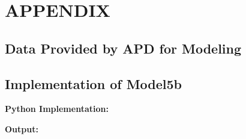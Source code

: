 \chapter{APPENDIX}\newpage

\section{Data Provided by APD for Modeling}



\section{Implementation of Model5b}\label{}
\textbf{Python Implementation:}


\textbf{Output:}

